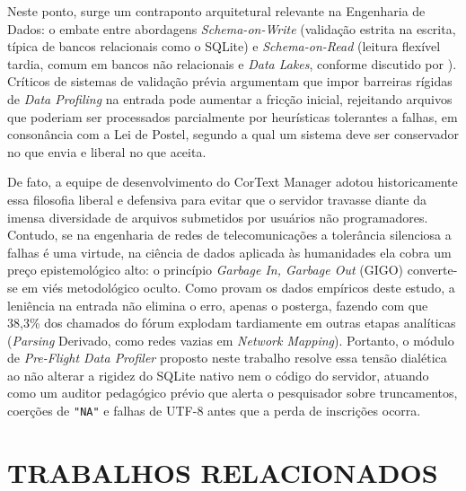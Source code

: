 \documentclass[
	oneside,
	a4paper,
	12pt,
	chapter=TITLE,
	section=TITLE,
	english,
	brazilian
]{abntex2}
\begin{document}
Neste ponto, surge um contraponto arquitetural relevante na Engenharia de Dados: o embate entre abordagens \textit{Schema-on-Write} (validação estrita na escrita, típica de bancos relacionais como o SQLite) e \textit{Schema-on-Read} (leitura flexível tardia, comum em bancos não relacionais e \textit{Data Lakes}, conforme discutido por ). Críticos de sistemas de validação prévia argumentam que impor barreiras rígidas de \textit{Data Profiling} na entrada pode aumentar a fricção inicial, rejeitando arquivos que poderiam ser processados parcialmente por heurísticas tolerantes a falhas, em consonância com a Lei de Postel, segundo a qual um sistema deve ser conservador no que envia e liberal no que aceita.

De fato, a equipe de desenvolvimento do CorText Manager adotou historicamente essa filosofia liberal e defensiva para evitar que o servidor travasse diante da imensa diversidade de arquivos submetidos por usuários não programadores. Contudo, se na engenharia de redes de telecomunicações a tolerância silenciosa a falhas é uma virtude, na ciência de dados aplicada às humanidades ela cobra um preço epistemológico alto: o princípio \textit{Garbage In, Garbage Out} (GIGO) converte-se em viés metodológico oculto. Como provam os dados empíricos deste estudo, a leniência na entrada não elimina o erro, apenas o posterga, fazendo com que 38,3\% dos chamados do fórum explodam tardiamente em outras etapas analíticas (\textit{Parsing} Derivado, como redes vazias em \textit{Network Mapping}). Portanto, o módulo de \textit{Pre-Flight Data Profiler} proposto neste trabalho resolve essa tensão dialética ao não alterar a rigidez do SQLite nativo nem o código do servidor, atuando como um auditor pedagógico prévio que alerta o pesquisador sobre truncamentos, coerções de \texttt{"NA"} e falhas de UTF-8 antes que a perda de inscrições ocorra.

\FloatBarrier
\section{TRABALHOS RELACIONADOS}\label{sec:trabalhos_relacionados}
\end{document}
